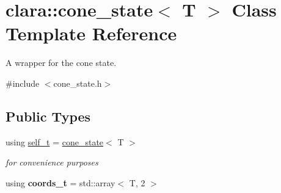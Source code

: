 \hypertarget{classclara_1_1cone__state}{}\section{clara\+:\+:cone\+\_\+state$<$ T $>$ Class Template Reference}
\label{classclara_1_1cone__state}


A wrapper for the cone state.  




{\ttfamily \#include $<$cone\+\_\+state.\+h$>$}

\subsection*{Public Types}
\begin{DoxyCompactItemize}
\item 
\mbox{\label{classclara_1_1cone__state_a74ce83ddac5e4056fd4bb1e7d217f9f8}} 
using \hyperlink{classclara_1_1cone__state_a74ce83ddac5e4056fd4bb1e7d217f9f8}{self\+\_\+t} = \hyperlink{classclara_1_1cone__state}{cone\+\_\+state}$<$ T $>$
\begin{DoxyCompactList}\small\item\em for convenience purposes \end{DoxyCompactList}\item 
\mbox{\label{classclara_1_1cone__state_af16fa702d40bf1aa21315c5df376c797}} 
using {\bfseries coords\+\_\+t} = std\+::array$<$ T, 2 $>$
\end{DoxyCompactItemize}
